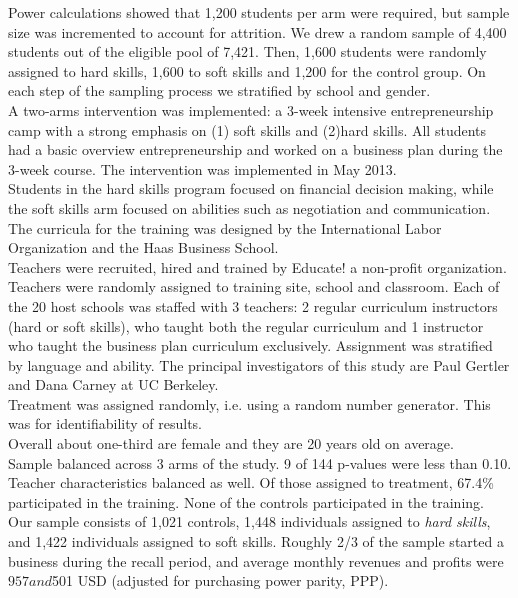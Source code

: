 Power calculations showed that 1,200 students per arm were required, but sample size was incremented to account for attrition. We drew a random sample of 4,400 students out of the eligible pool of 7,421. Then, 1,600 students were randomly assigned to hard skills, 1,600 to soft skills and 1,200 for the control group. On each step of the sampling process we stratified by school and gender.\\

A two-arms intervention was implemented: a 3-week intensive entrepreneurship camp with a strong emphasis on (1) soft skills and (2)hard skills. All students had a basic overview entrepreneurship and worked on a business plan during the 3-week course. The intervention was implemented in May 2013. \\

Students in the hard skills program focused on financial decision making, while the soft skills arm focused on abilities such as negotiation and communication. The curricula for the training was designed by the International Labor Organization and the Haas Business School.\\

Teachers were recruited, hired and trained by Educate! a non-profit organization. Teachers were randomly assigned to training site, school and classroom. Each of the 20 host schools was staffed with 3 teachers: 2 regular curriculum instructors (hard or soft skills), who taught both the regular curriculum and 1 instructor who taught the business plan curriculum exclusively. Assignment was stratified by language and ability. The principal investigators of this study are Paul Gertler and Dana Carney at UC Berkeley.\\

Treatment was assigned randomly, i.e. using a random number generator. This was for identifiability of results.\\

Overall about one-third are female and they are 20 years old on average.\\

Sample balanced across 3 arms of the study. 9 of 144 p-values were less than 0.10. Teacher characteristics balanced as well. Of those assigned to treatment, 67.4\% participated in the training. None of the controls participated in the training. Our sample consists of 1,021 controls, 1,448 individuals assigned to \textit{hard skills}, and 1,422 individuals assigned to soft skills. Roughly 2/3 of the sample started a business during the recall period, and average monthly revenues and profits were $957 and $501 USD (adjusted for purchasing power parity, PPP).\\


